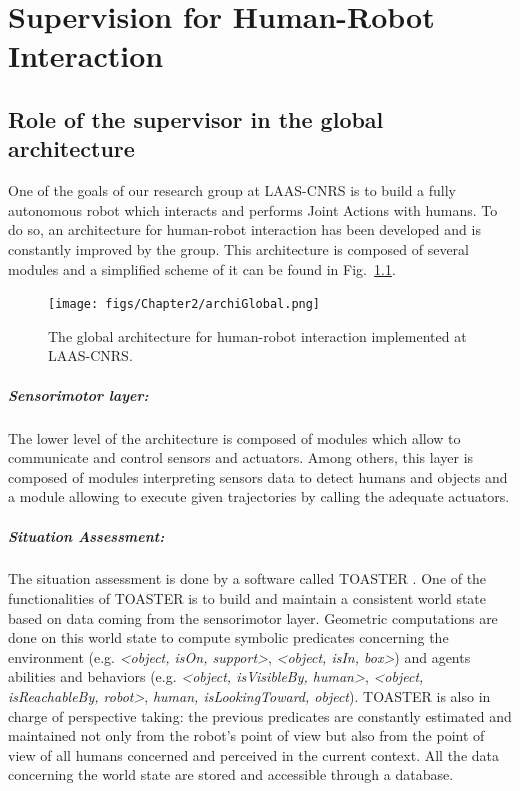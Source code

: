\documentclass[english,a4paper,11pt,twoside]{StyleThese}
\begin{document}
\setcounter{chapter}{1} %
\dominitoc
\faketableofcontents
\fi

\chapter{Supervision for Human-Robot Interaction}
\minitoc

\label{ch:Sup}

\section{Role of the supervisor in the global architecture}

\label{sec:globalArchi}

One of the goals of our research group at LAAS-CNRS is to build a fully autonomous robot which interacts and performs Joint Actions with humans. To do so, an architecture for human-robot interaction has been developed and is constantly improved by the group. This architecture is composed of several modules and a simplified scheme of it can be found in Fig.~\ref{fig:GlobalArchi}.

\begin{figure}[!h]
	\centering
    \texttt{[image: figs/Chapter2/archiGlobal.png]}
    \caption{The global architecture for human-robot interaction implemented at LAAS-CNRS.}
    \label{fig:GlobalArchi}
\end{figure}

\paragraph{Sensorimotor layer:}
The lower level of the architecture is composed of modules which allow to communicate and control sensors and actuators. Among others, this layer is composed of modules interpreting sensors data to detect humans and objects and a module allowing to execute given trajectories by calling the adequate actuators.

\paragraph{Situation Assessment:}
The situation assessment is done by a software called TOASTER \cite{milliezThesis}. One of the functionalities of TOASTER is to build and maintain a consistent world state based on data coming from the sensorimotor layer. Geometric computations are done on this world state to compute symbolic predicates concerning the environment (e.g. \textit{<object, isOn, support>}, \textit{<object, isIn, box>}) and agents abilities and behaviors (e.g. \textit{<object, isVisibleBy, human>}, \textit{<object, isReachableBy, robot>}, \textit{human, isLookingToward, object}). TOASTER is also in charge of perspective taking: the previous predicates are constantly estimated and maintained not only from the robot’s point of view but also from the point of view of all humans concerned and perceived in the current context. All the data concerning the world state are stored and accessible through a database.
\end{document}
